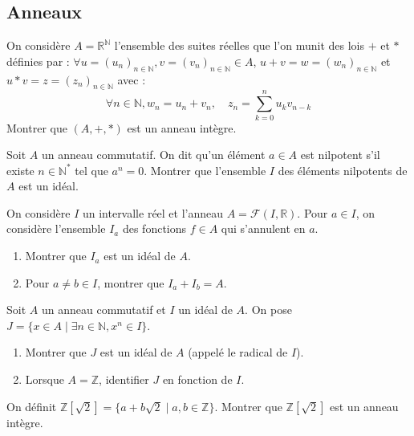 \subsection{Anneaux}

\begin{exercice}
On considère $A=\mathbb{R}^{\mathbb{N}}$ l'ensemble des suites réelles que l'on munit des lois $+$ et $*$ définies par :
$\forall u=(u_{n})_{n\in\mathbb{N}}, v=(v_{n})_{n\in\mathbb{N}}\in A$, $u+v=w=(w_{n})_{n\in \mathbb{N}}$ et $u*v=z=(z_{n})_{n\in \mathbb{N}}$ avec :
$$ \forall n\in\mathbb{N}, w_{n}=u_{n}+v_{n}, \quad z_{n}=\sum_{k=0}^{n}u_{k}v_{n-k} $$
Montrer que $(A,+,*)$ est un anneau intègre.
\end{exercice}

\begin{exercice}
Soit $A$ un anneau commutatif. On dit qu'un élément $a\in A$ est nilpotent s'il existe $n\in \mathbb{N}^{*}$ tel que $a^{n}=0$.
Montrer que l'ensemble $I$ des éléments nilpotents de $A$ est un idéal.
\end{exercice}

\begin{exercice}
On considère $I$ un intervalle réel et l'anneau $A=\mathcal{F}(I,\mathbb{R})$. Pour $a\in I$, on considère l'ensemble $I_{a}$ des fonctions $f\in A$ qui s'annulent en $a$.
\begin{enumerate}
    \item Montrer que $I_{a}$ est un idéal de $A$.
    \item Pour $a\ne b\in I$, montrer que $I_{a}+I_{b}=A$.
\end{enumerate}
\end{exercice}

\begin{exercice}
Soit $A$ un anneau commutatif et $I$ un idéal de $A$. On pose $J=\{x\in A \mid \exists n\in\mathbb{N}, x^{n}\in I\}$.
\begin{enumerate}
    \item Montrer que $J$ est un idéal de $A$ (appelé le radical de $I$).
    \item Lorsque $A=\mathbb{Z}$, identifier $J$ en fonction de $I$.
\end{enumerate}
\end{exercice}

\begin{exercice}
On définit $\mathbb{Z}[\sqrt{2}]=\{a+b\sqrt{2} \mid a,b\in\mathbb{Z}\}$.
Montrer que $\mathbb{Z}[\sqrt{2}]$ est un anneau intègre.
\end{exercice}

